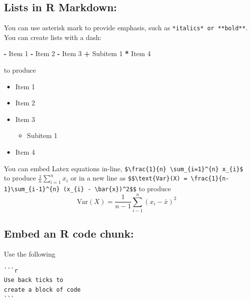 \documentclass[
]{book}
\newenvironment{Shaded}{\begin{snugshade}}{\end{snugshade}}
\newcommand{\DecValTok}[1]{\textcolor[rgb]{0.00,0.00,0.81}{#1}}
\newcommand{\NormalTok}[1]{#1}
\newcommand{\SpecialCharTok}[1]{\textcolor[rgb]{0.81,0.36,0.00}{\textbf{#1}}}
\providecommand{\tightlist}{%
  \setlength{\itemsep}{0pt}\setlength{\parskip}{0pt}}
\begin{document}
\hypertarget{lists-in-r-markdown}{%
\subsection{Lists in R Markdown:}\label{lists-in-r-markdown}}

You can use asterisk mark to provide emphasis, such as \texttt{*italics*\ or\ **bold**}. You can create lists with a dash:

\begin{Shaded}
\begin{Highlighting}[]
\SpecialCharTok{{-}}\NormalTok{ Item }\DecValTok{1}
\SpecialCharTok{{-}}\NormalTok{ Item }\DecValTok{2}
\SpecialCharTok{{-}}\NormalTok{ Item }\DecValTok{3}
  \SpecialCharTok{+}\NormalTok{ Subitem }\DecValTok{1}
\SpecialCharTok{*}\NormalTok{ Item }\DecValTok{4}
\end{Highlighting}
\end{Shaded}

to produce

\begin{itemize}
\tightlist
\item
  Item 1
\item
  Item 2
\item
  Item 3

  \begin{itemize}
  \tightlist
  \item
    Subitem 1
  \end{itemize}
\item
  Item 4
\end{itemize}

You can embed Latex equations in-line, \texttt{\$\textbackslash{}frac\{1\}\{n\}\ \textbackslash{}sum\_\{i=1\}\^{}\{n\}\ x\_\{i\}\$} to produce \(\frac{1}{n} \sum_{i=1}^{n} x_{i}\) or in a new line as \texttt{\$\$\textbackslash{}text\{Var\}(X)\ =\ \textbackslash{}frac\{1\}\{n-1\}\textbackslash{}sum\_\{i-1\}\^{}\{n\}\ (x\_\{i\}\ -\ \textbackslash{}bar\{x\})\^{}2\$\$} to produce \[\text{Var}(X) = \frac{1}{n-1}\sum_{i-1}^{n} (x_{i} - \bar{x})^2\]

\hypertarget{embed-an-r-code-chunk}{%
\subsection{Embed an R code chunk:}\label{embed-an-r-code-chunk}}

Use the following

\begin{verbatim}
```r
Use back ticks to 
create a block of code
```
\end{verbatim}
\end{document}
